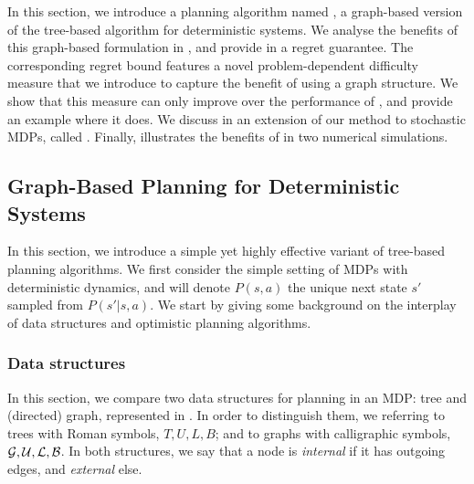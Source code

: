 In this section, we introduce a planning algorithm named \GBOPD, a graph-based version of the tree-based \OPD algorithm for deterministic systems. We analyse the benefits of this graph-based formulation in , and provide in  a regret guarantee. The corresponding regret bound features a novel problem-dependent difficulty measure that we introduce to capture the benefit of using a graph structure. We show that this measure can only improve over the performance of \OPD, and provide an example where it does. We discuss in  an extension of our method to stochastic MDPs, called \GBOP. Finally,  illustrates the benefits of \GBOP in two numerical simulations.

\subsection{Graph-Based Planning for Deterministic Systems}
\label{sec:gbopd}

In this section, we introduce a simple yet highly effective variant of tree-based planning algorithms. We first consider the simple setting of \glspl{MDP} with deterministic dynamics, and will denote $P(s,a)$ the unique next state $s'$ sampled from $P\left(s'|s,a\right)$.
We start by giving some background on the interplay of data structures and optimistic planning algorithms.

\subsubsection{Data structures}

In this section, we compare two data structures for planning in an MDP: tree and (directed) graph, represented in . In order to distinguish them, we referring to trees with Roman symbols, \eg $T, U, L, B$; and to graphs with calligraphic symbols, \eg $\mathcal{G}, \mathcal{U}, \mathcal{L}, \mathcal{B}$. In both structures, we say that a node is \emph{internal} if it has outgoing edges, and \emph{external} else.

